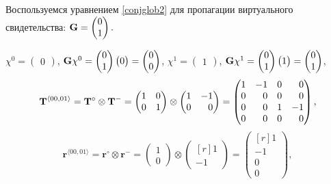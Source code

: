 Воспользуемся уравнением \ref{conjglob2} для пропагации виртуального свидетельства:
$\mathbf{G} = \begin{pmatrix} 0 \\ 1\end{pmatrix}.$

$\chi^0 = \begin{pmatrix} 0 \end{pmatrix} $, 
$ \mathbf{G} \chi^0 = \begin{pmatrix} 0 \\ 1 \end{pmatrix} \begin{pmatrix} 0 \end{pmatrix} = \begin{pmatrix}  0 \\ 0 \end{pmatrix}$,
$\chi^1 = \begin{pmatrix} 1 \end{pmatrix} $, 
$ \mathbf{G} \chi^1 =  \begin{pmatrix} 0 \\ 1 \end{pmatrix}\begin{pmatrix} 1 \end{pmatrix} = \begin{pmatrix}  0 \\ 1 \end{pmatrix}$,
\begin{equation*}
\T^{\langle 00, 01 \rangle} = \T^\circ \otimes \T^- = 
\begin{pmatrix} 1 & 0 \\ 0 & 1\end{pmatrix} \otimes
\begin{pmatrix*}[r] 1 & -1 \\ 0 & 0 \end{pmatrix*} = 
\begin{pmatrix*}[r] 1 & -1 & 0  & 0 \\ 0 & 0 & 0 & 0 \\ 0 & 0 & 1 & -1 \\ 0 & 0 & 0 & 0 \end{pmatrix*},
\end{equation*}
\begin{equation*}
\mathbf{r}^{\langle 00, 01 \rangle} = \mathbf{r}^\circ \otimes \mathbf{r}^- = \begin{pmatrix} 1 \\ 0 \end{pmatrix} \otimes \begin{pmatrix*}[r]  1 \\ -1 \end{pmatrix*} = \begin{pmatrix*}[r] 1 \\ -1 \\ 0 \\ 0 \end{pmatrix*},
\end{equation*}
